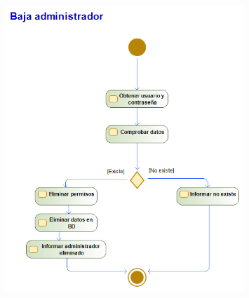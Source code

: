 \begin{figure}[H]
    \centering
    \includegraphics[width=0.8\textwidth]{Use_Cases/baja_admin.png}
\end{figure}
\newpage
